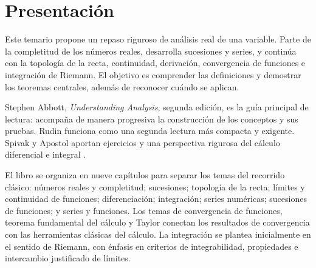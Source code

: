 \chapter*{Presentación}

Este temario propone un repaso riguroso de análisis real de una variable. Parte de la completitud de los números reales, desarrolla sucesiones y series, y continúa con la topología de la recta, continuidad, derivación, convergencia de funciones e integración de Riemann. El objetivo es comprender las definiciones y demostrar los teoremas centrales, además de reconocer cuándo se aplican.

Stephen Abbott, \emph{Understanding Analysis}, segunda edición, es la guía principal de lectura: acompaña de manera progresiva la construcción de los conceptos y sus pruebas. Rudin funciona como una segunda lectura más compacta y exigente. Spivak y Apostol aportan ejercicios y una perspectiva rigurosa del cálculo diferencial e integral \cite{abbott2015,rudin1976,spivak2008,apostol1974}.

El libro se organiza en nueve capítulos para separar los temas del recorrido clásico: números reales y completitud; sucesiones; topología de la recta; límites y continuidad de funciones; diferenciación; integración; series numéricas; sucesiones de funciones; y series y funciones. Los temas de convergencia de funciones, teorema fundamental del cálculo y Taylor conectan los resultados de convergencia con las herramientas clásicas del cálculo. La integración se plantea inicialmente en el sentido de Riemann, con énfasis en criterios de integrabilidad, propiedades e intercambio justificado de límites.

